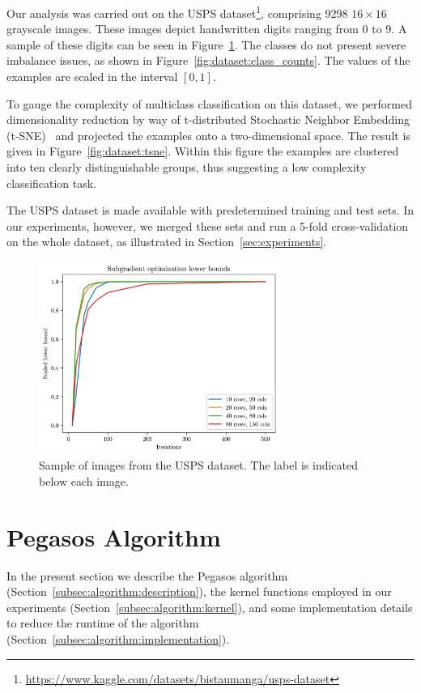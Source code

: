 \documentclass[runningheads]{llncs}
\begin{document}
Our analysis was carried out on the USPS dataset\footnote{\url{https://www.kaggle.com/datasets/bistaumanga/usps-dataset}}, comprising 9298 $16\times16$ grayscale images. These images depict handwritten digits ranging from 0 to 9. A sample of these digits can be seen in Figure~\ref{fig:dataset:digits}. The classes do not present severe imbalance issues, as shown in Figure~\ref{fig:dataset:class_counts}. The values of the examples are scaled in the interval $[0, 1]$.

To gauge the complexity of multiclass classification on this dataset, we performed dimensionality reduction by way of  t-distributed Stochastic Neighbor Embedding (t-SNE)~\cite{maaten-2008-tsne} and projected the examples onto a two-dimensional space. The result is given in Figure~\ref{fig:dataset:tsne}. Within this figure the examples are clustered into ten clearly distinguishable groups, thus suggesting a low complexity classification task.   

The USPS dataset is made available with predetermined training and test sets. In our experiments, however, we merged these sets and run a 5-fold cross-validation on the whole dataset, as illustrated in Section~\ref{sec:experiments}. 

\begin{figure}
  \center
  \includegraphics[width=0.7\textwidth]{img/subgrad_lb.png}
  \caption{Sample of images from the USPS dataset. The label is indicated below each image.} 
  \label{fig:dataset:digits}
\end{figure}

\section{Pegasos Algorithm}
\label{sec:algorithm}

In the present section we describe the Pegasos algorithm (Section~\ref{subsec:algorithm:description}), the kernel functions employed in our experiments (Section~\ref{subsec:algorithm:kernel}), and some implementation details to reduce the runtime of the algorithm (Section~\ref{subsec:algorithm:implementation}).
\end{document}
